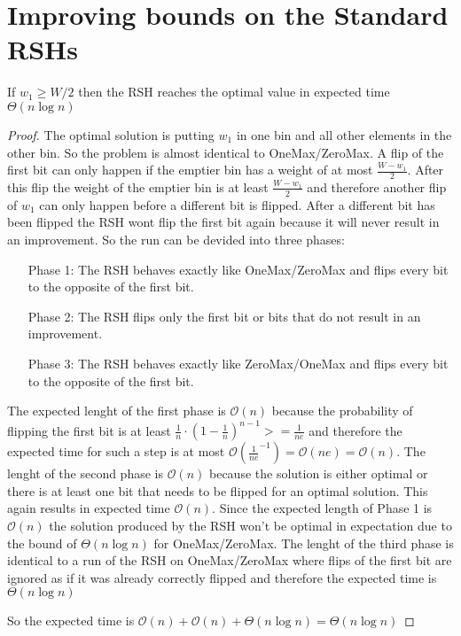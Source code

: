 \section{Improving bounds on the Standard RSHs}
\begin{lemma}\label{OneMaxResult}
If $w_1 \ge W/2$  then the RSH reaches the optimal value in expected time $\Theta(n\log{}n)$
\end{lemma}
\begin{proof}
The optimal solution is putting $w_1$ in one bin and all other elements in the other bin. So the problem is almost identical to OneMax/ZeroMax. A flip of the first bit can only happen if the emptier bin has a weight of at most $\frac {W-w_1}{2}$. After this flip the weight of the emptier bin is at least $\frac {W-w_1}{2}$ and therefore another flip of $w_1$ can only happen before a different bit is flipped. After a different bit has been flipped the RSH wont flip the first bit again because it will never result in an improvement. So the run can be devided into three phases:
\begin{itemize}
    \item[Phase 1:] The RSH behaves exactly like OneMax/ZeroMax and flips every bit to the opposite of the first bit.
    \item[Phase 2:] The RSH flips only the first bit or bits that do not result in an improvement.
    \item[Phase 3:] The RSH behaves exactly like ZeroMax/OneMax and flips every bit to the opposite of the first bit.
\end{itemize}

The expected lenght of the first phase is $\mathcal{O}(n)$ because the probability of flipping the first bit is at least ${\frac{1}{n}} \cdot {(1 - \frac{1}{n})}^{n-1} >= \frac{1}{ne}$ and therefore the expected time for such a step is at most $\mathcal{O}(\frac{1}{ne}^{-1}) = \mathcal{O}(ne) = \mathcal{O}(n)$.\newline
The lenght of the second phase is $\mathcal{O}(n)$ because the solution is either optimal or there is at least one bit that needs to be flipped for an optimal solution. This again results in expected time $\mathcal{O}(n)$. Since the expected length of Phase 1 is $\mathcal{O}(n)$ the solution produced by the RSH won't be optimal in expectation due to the bound of $\Theta(n\log{}n)$ for OneMax/ZeroMax.\newline
The lenght of the third phase is identical to a run of the RSH on OneMax/ZeroMax where flips of the first bit are ignored as if it was already correctly flipped and therefore the expected time is $\Theta(n\log{}n)$

So the expected time is $\mathcal{O}(n) + \mathcal{O}(n) + \Theta(n\log{}n) = \Theta(n\log{}n)$ 
\end{proof}

